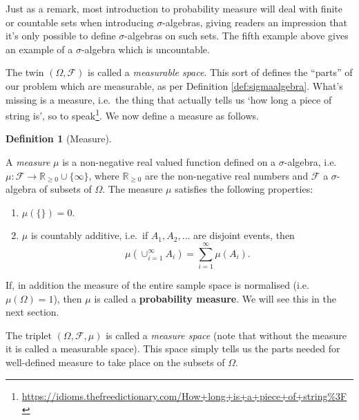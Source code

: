 \documentclass[
]{book}
\providecommand{\tightlist}{%
  \setlength{\itemsep}{0pt}\setlength{\parskip}{0pt}}
\newcommand{\bbR}{\mathbb{R}}
\newcommand{\cF}{{\mathcal F}}
\theoremstyle{definition}
\newtheorem{definition}{Definition}[chapter]
\theoremstyle{definition}
\theoremstyle{definition}
\theoremstyle{definition}
\theoremstyle{remark}
\begin{document}
Just as a remark, most introduction to probability measure will deal with finite or countable sets when introducing \(\sigma\)-algebras, giving readers an impression that it's only possible to define \(\sigma\)-algebras on such sets. The fifth example above gives an example of a \(\sigma\)-algebra which is uncountable.

The twin \((\Omega,\cF)\) is called a \emph{measurable space}. This sort of defines the ``parts'' of our problem which are measurable, as per Definition \ref{def:sigmaalgebra}. What's missing is a measure, i.e.~the thing that actually tells us `how long a piece of string is', so to speak\footnote{\url{https://idioms.thefreedictionary.com/How+long+is+a+piece+of+string\%3F}}. We now define a measure as follows.

\begin{definition}[Measure]
\protect\hypertarget{def:measure}{}\label{def:measure}

A \emph{measure} \(\mu\) is a non-negative real valued function defined on a \(\sigma\)-algebra, i.e.~\(\mu:\cF\to\bbR_{\geq 0}\cup\{\infty\}\), where \(\bbR_{\geq 0}\) are the non-negative real numbers and \(\cF\) a \(\sigma\)-algebra of subsets of \(\Omega\). The measure \(\mu\) satisfies the following properties:

\begin{enumerate}
\def\labelenumi{\roman{enumi}.}
\tightlist
\item
  \(\mu(\{\})=0\).
\item
  \(\mu\) is countably additive, i.e.~if \(A_1,A_2,\dots\) are disjoint events, then \[\mu\left( \cup_{i=1}^\infty A_i \right) = \sum_{i=1}^\infty \mu(A_i).\]
\end{enumerate}

\end{definition}

If, in addition the measure of the entire sample space is normalised (i.e.~\(\mu(\Omega)=1\)), then \(\mu\) is called a \textbf{probability measure}. We will see this in the next section.

The triplet \((\Omega,\cF,\mu)\) is called a \emph{measure space} (note that without the measure it is called a measurable space).
This space simply tells us the parts needed for well-defined measure to take place on the subsets of \(\Omega\).
\end{document}

